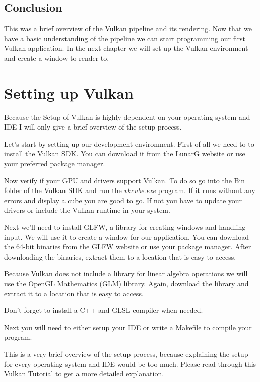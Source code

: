 \documentclass[12pt]{report} \usepackage{preamble}
\begin{document}
\section{Conclusion}

This was a brief overview of the Vulkan pipeline and its rendering. Now that we have a basic understanding of the pipeline we can start
programming our first Vulkan application. In the next chapter we will set up the Vulkan environment and create a window to render to.

\chapter{Setting up Vulkan}

Because the Setup of Vulkan is highly dependent on your operating system and IDE I will only give a brief overview of the setup process.

Let's start by setting up our development environment. First of all we need to to install the Vulkan SDK. You can download it from the
\href{https://vulkan.lunarg.com/sdk/home}{LunarG} website or use your preferred package manager.

Now verify if your GPU and drivers support Vulkan. To do so go into the Bin folder of the Vulkan SDK and run the
\textit{vkcube.exe} program. If it runs without any errors and display a cube you are good to go. If not you have to update your drivers or
include the Vulkan runtime in your system.

Next we'll need to install GLFW, a library for creating windows and handling input. We will use it to create a window for our application.
You can download the 64-bit binaries from the \href{https://www.glfw.org/download.html}{GLFW} website or
use your package manager. After downloading the binaries, extract them to a location that is easy to access.

Because Vulkan does not include a library for linear algebra operations we will use the \href{https://github.com/g-truc/glm}{OpenGL Mathematics}
(GLM) library. Again, download the library and extract it to a location that is easy to access.

Don't forget to install a C++ and GLSL compiler when needed.

Next you will need to either setup your IDE or write a Makefile to compile your program.

This is a very brief overview of the setup process, because explaining the setup for every operating system and IDE would be too much.
Please read through this \href{https://vulkan-tutorial.com/Development_environment}{Vulkan Tutorial} to get a more detailed explanation.
\end{document}

